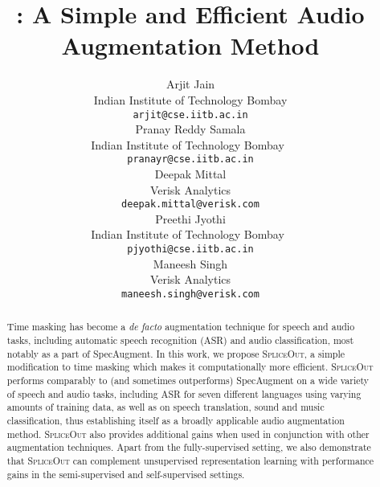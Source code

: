 \documentclass{article}
\title{\SpA: A Simple and Efficient Audio Augmentation Method}
\author{%
  Arjit Jain \\
  Indian Institute of Technology Bombay\\
  \texttt{arjit@cse.iitb.ac.in} \\
   \And
   Pranay Reddy Samala \\
   Indian Institute of Technology Bombay\ \\
   \texttt{pranayr@cse.iitb.ac.in} \\
   \AND
   Deepak Mittal \\
   Verisk Analytics \\
   \texttt{deepak.mittal@verisk.com} \\
   \And
   Preethi Jyothi \\
   Indian Institute of Technology Bombay\ \\
   \texttt{pjyothi@cse.iitb.ac.in} \\
   \And
   Maneesh Singh \\
   Verisk Analytics \\
   \texttt{maneesh.singh@verisk.com} \\
}
\newcommand{\SpA}{{\textsc{SpliceOut}}\xspace}
\begin{document}
\maketitle

\begin{abstract}
Time masking has become a \textit{de facto} augmentation technique for speech and audio tasks, including automatic speech recognition (ASR) and audio classification, most notably as a part of SpecAugment. %
In this work, we propose \SpA, a simple modification to time masking which makes it computationally more  efficient. \SpA performs comparably to (and sometimes outperforms) SpecAugment on a wide variety of speech and audio tasks, including ASR for seven different languages using varying amounts of training data, as well as on speech translation, sound and music classification, thus establishing itself as a broadly applicable audio augmentation method. \SpA also provides additional gains when used in conjunction with other augmentation techniques. Apart from the fully-supervised setting, we also demonstrate that \SpA can complement unsupervised representation learning with performance gains in the semi-supervised and self-supervised settings. %
\end{abstract}
\end{document}
